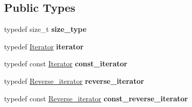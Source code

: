 \subsection*{Public Types}
\begin{DoxyCompactItemize}
\item 
typedef size\+\_\+t {\bfseries size\+\_\+type}\hypertarget{classtasks_1_1Vector_ad15410e1b4600464b7c430eb5415fb0f}{}\label{classtasks_1_1Vector_ad15410e1b4600464b7c430eb5415fb0f}

\item 
typedef \hyperlink{classtasks_1_1Vector_1_1Iterator}{Iterator} {\bfseries iterator}\hypertarget{classtasks_1_1Vector_af3a0439eaa6a505b4e103b90839a62a8}{}\label{classtasks_1_1Vector_af3a0439eaa6a505b4e103b90839a62a8}

\item 
typedef const \hyperlink{classtasks_1_1Vector_1_1Iterator}{Iterator} {\bfseries const\+\_\+iterator}\hypertarget{classtasks_1_1Vector_ac993a9fef88127fd67e4d22caf22801f}{}\label{classtasks_1_1Vector_ac993a9fef88127fd67e4d22caf22801f}

\item 
typedef \hyperlink{classtasks_1_1Vector_1_1Reverse__iterator}{Reverse\+\_\+iterator} {\bfseries reverse\+\_\+iterator}\hypertarget{classtasks_1_1Vector_adffc12e2f123ad2b852cc06bd3d4fa50}{}\label{classtasks_1_1Vector_adffc12e2f123ad2b852cc06bd3d4fa50}

\item 
typedef const \hyperlink{classtasks_1_1Vector_1_1Reverse__iterator}{Reverse\+\_\+iterator} {\bfseries const\+\_\+reverse\+\_\+iterator}\hypertarget{classtasks_1_1Vector_a58391df52d2471ac8e6daf5fc3634dc1}{}\label{classtasks_1_1Vector_a58391df52d2471ac8e6daf5fc3634dc1}

\end{DoxyCompactItemize}
